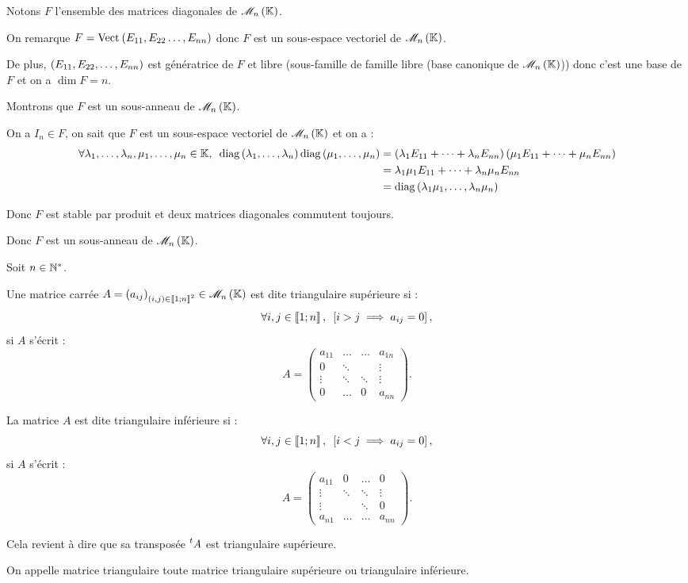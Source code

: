 \begin{dem}
Notons \(F\) l'ensemble des matrices diagonales de \(\M{n}\).

On remarque \(F=\Vect{E_{11},E_{22}\dots,E_{nn}}\) donc \(F\) est un sous-espace vectoriel de \(\M{n}\).

De plus, \(\left(E_{11},E_{22},\dots,E_{nn}\right)\) est génératrice de \(F\) et libre (sous-famille de famille libre (base canonique de \(\M{n}\))) donc c'est une base de \(F\) et on a \(\dim F=n\).

Montrons que \(F\) est un sous-anneau de \(\M{n}\).

On a \(I_n\in F\), on sait que \(F\) est un sous-espace vectoriel de \(\M{n}\) et on a : \[\begin{aligned}
\quantifs{\forall\lambda_1,\dots,\lambda_n,\mu_1,\dots,\mu_n\in\K}\diag{\lambda_1,\dots,\lambda_n}\diag{\mu_1,\dots,\mu_n}&=\paren{\lambda_1E_{11}+\dots+\lambda_nE_{nn}}\paren{\mu_1E_{11}+\dots+\mu_nE_{nn}} \\
&=\lambda_1\mu_1E_{11}+\dots+\lambda_n\mu_nE_{nn} \\
&=\diag{\lambda_1\mu_1,\dots,\lambda_n\mu_n}
\end{aligned}\]

Donc \(F\) est stable par produit et deux matrices diagonales commutent toujours.

Donc \(F\) est un sous-anneau de \(\M{n}\).
\end{dem}

\begin{defi}
Soit \(n\in\mathbb{N}^*\).

Une matrice carrée \(A=\paren{a_{ij}}_{\paren{i,j}\in\interventierii{1}{n}^2}\in\M{n}\) est dite triangulaire supérieure si : \[\quantifs{\forall i,j\in\interventierii{1}{n}}\croch{i>j\imp a_{ij}=0},\] \cad si \(A\) s'écrit : \[A=\begin{pmatrix}
a_{11} & \dots & \dots & a_{1n} \\
0 & \ddots & & \vdots \\
\vdots & \ddots & \ddots & \vdots \\
0 & \dots & 0 & a_{nn}
\end{pmatrix}.\]

La matrice \(A\) est dite triangulaire inférieure si : \[\quantifs{\forall i,j\in\interventierii{1}{n}}\croch{i<j\imp a_{ij}=0},\] \cad si \(A\) s'écrit : \[A=\begin{pmatrix}
a_{11} & 0 & \dots & 0 \\
\vdots & \ddots & \ddots & \vdots \\
\vdots & & \ddots & 0 \\
a_{n1} & \dots & \dots & a_{nn}
\end{pmatrix}.\]

Cela revient à dire que sa transposée \(\prescript{t}{}{A}\) est triangulaire supérieure.

On appelle matrice triangulaire toute matrice triangulaire supérieure ou triangulaire inférieure.
\end{defi}

